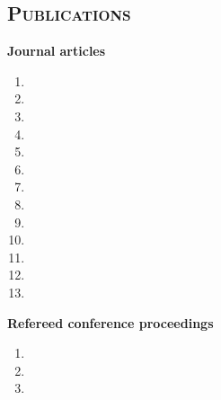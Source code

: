 \documentclass[10pt]{article} %
\begin{document}
\begin{resume}
{\section{\textnormal{\textsc{Publications}}} 
}
\nobibliography*
\noindent\textbf{Journal articles}\\
\begin{enumerate}[1.]%
\item {}
\item {}
\item {}
\iftoggle{compact}{}{
\item \bibentry{adiga2018graphical}
}
\item {}
\iftoggle{compact}{}{
\item \bibentry{adiga2018sublinear}
}
\item {}
\iftoggle{compact}{}{
\item \bibentry{adiga2017inferring}
\item \bibentry{adiga2017activity}
}
\item {}
\item {}
\item {}
\iftoggle{compact}{}{
\item \bibentry{adiga2014constant}
\item \bibentry{wu2014limit}
}
\item {}
\iftoggle{compact}{}{
\item \bibentry{adiga2014cubicity}
}
\item {}
\item {}
\item {}
\item {}
\end{enumerate}
\noindent\textbf{Refereed conference proceedings}\\
\begin{enumerate}[1.]%
\item {}
\item {}
\item {}
\iftoggle{compact}{}{
\item \bibentry{cedeno2019mechanistic}
\item \bibentry{ren2018generative}
}
\end{enumerate}
\end{resume}
\end{document}
